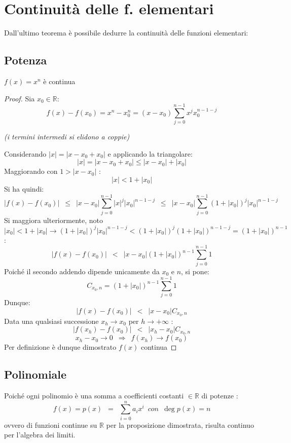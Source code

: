 \documentclass[10pt, oneside]{book}
\theoremstyle{plain}
\begin{document}
\hypertarget{elementarii}{\section{Continuità delle f. elementari}
Dall'ultimo teorema è possibile dedurre la continuità delle funzioni elementari:}
\subsection*{Potenza}
\begin{prop}
$f(x) = x^n$ è continua
\end{prop}
\begin{proof}
Sia $x_0 \in \mathbb{R}$: 
\[f(x) - f(x_0) = x^n - x_0^n = (x-x_0)\sum \limits_{j=0}^{n-1} x^j x_0^{n-1-j} \]
\begin{center} \textit{(i termini intermedi si elidono a coppie)} \end{center}
Considerando $|x| = |x - x_0 + x_0|$ e applicando la triangolare: 
\[|x| = |x-x_0 + x_0| \leq |x - x_0| + |x_0|\] Maggiorando con $1 > |x - x_0|$ : \[|x| < 1 + |x_0|\]
Si ha quindi:
\[|f(x) - f(x_0)| \enspace \leq  \enspace |x-x_0| \sum \limits_{j=0}^{n-1} |x|^j |x_0|^{n-1-j} \enspace \leq \enspace |x-x_0| \sum \limits_{j=0}^{n-1} (1+|x_0|)^j |x_0|^{n-1-j}\]
Si maggiora ulteriormente, noto $|x_0| < 1 + |x_0| \rightarrow (1+|x_0|)^j |x_0|^{n-1-j} < (1+|x_0|)^j (1 + |x_0|)^{n-1-j} = (1 + |x_0|)^{n-1}$:
\[|f(x) - f(x_0)| \enspace <  \enspace |x-x_0| (1+|x_0|)^{n-1} \sum \limits_{j=0}^{n-1} 1\]
Poiché il secondo addendo dipende unicamente da $x_0$ e $n$, si pone:
\[C_{x_0, n} = (1+|x_0|)^{n-1} \sum \limits_{j=0}^{n-1} 1\]
Dunque:
\[|f(x) - f(x_0)| \enspace <  \enspace |x-x_0|  C_{x_0, n}\]
Data una qualsiasi successione $x_h \longrightarrow x_0$ per $h \rightarrow + \infty$ :
\[|f(x_h) - f(x_0)| \enspace < \enspace |x_h-x_0|  C_{x_0, n}\]
\[x_h-x_0 \rightarrow 0 \enspace \Longrightarrow \enspace f(x_h) \rightarrow f(x_0)\]
Per definizione è dunque dimostrato $f(x)$ continua
\end{proof}

\subsection*{Polinomiale}
Poiché ogni polinomio è una somma a coefficienti costanti $\in \mathbb{R}$ di potenze :
\[f(x) = p(x) \enspace = \enspace \sum \limits_{i=0}^n a_i x^i \enspace {con} \enspace \deg p(x) = n\]
ovvero di funzioni continue su $\mathbb{R}$ per la proposizione dimostrata, \hypertarget{contin}{risulta continuo} per l'algebra dei limiti.
\end{document}
